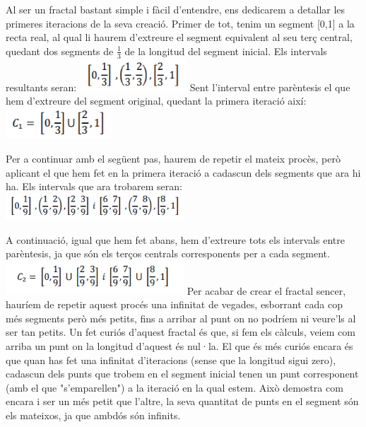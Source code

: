 \documentclass[12pt]{report}
\begin{document}
Al ser un fractal bastant simple i fàcil d'entendre, ens dedicarem a detallar les primeres iteracions de la seva creació.
\newline
Primer de tot, tenim un segment [0,1] a la recta real, al qual li haurem d'extreure el segment equivalent al seu terç central, quedant dos segments de $\frac{1}{3}$ de la longitud del segment inicial. Els intervals resultants seran:
\newline
\newline
 \hspace*{13em}\includegraphics[width=0.3\textwidth]{cantor1.PNG}
 \newline
 Sent l'interval entre parèntesis el que hem d'extreure del segment original, quedant la primera iteració així:
 \newline
 \hspace*{13em}\includegraphics[width=0.3\textwidth]{cantor2.PNG}

Per a continuar amb el següent pas, haurem de repetir el mateix procès, però aplicant el que hem fet en la primera iteració a cadascun dels segments que ara hi ha. Els intervals que ara trobarem seran:
\newline
\hspace*{11em}\includegraphics[width=0.5\textwidth]{cantor3.PNG}

A continuació, igual que hem fet abans, hem d'extreure tots els intervals entre parèntesis, ja que són els terços centrals corresponents per a cada segment.
\newline
\hspace*{11em}\includegraphics[width=0.5\textwidth]{cantor4.PNG}
\newline
Per acabar de crear el fractal sencer, hauríem de repetir aquest procés una infinitat de vegades, esborrant cada cop més segments però més petits, fins a arribar al punt on no podríem ni veure'ls al ser tan petits.
\newline
Un fet curiós d'aquest fractal és que, si fem els càlculs, veiem com arriba un punt on la longitud d'aquest és nul·la. El que és més curiós encara és que quan has fet una infinitat d'iteracions (sense que la longitud sigui zero), cadascun dels punts que trobem en el segment inicial tenen un punt corresponent (amb el que "s'emparellen") a la iteració en la qual estem. Això demostra com encara i ser un més petit que l'altre, la seva quantitat de punts en el segment són els mateixos, ja que ambdós són infinits.
\end{document}
